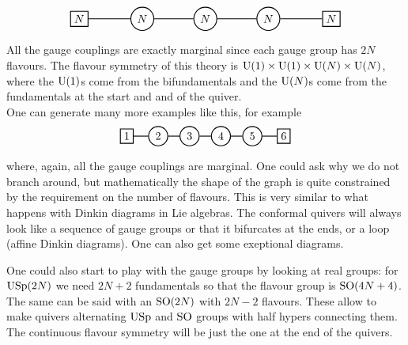 \begin{equation}
\begin{tikzpicture}[thick]
  \node[circle,draw] (one) at (0,0) {$N$};
  \node[circle,draw]  (two) at (2,0) {$N$};
  \node[circle,draw]  (three) at (4,0) {$N$};
  \node[rectangle,draw]  (flav1) at (-2,0) {$N$};
  \node[rectangle,draw]  (flav2) at (6,0) {$N$};
  \draw[-](one)--(two);
  \draw[-](two)--(three);
  \draw[-](one)--(flav1);
  \draw[-](flav2)--(three);
\end{tikzpicture}
\end{equation}
All the gauge couplings are exactly marginal since each gauge group has $2N$ flavours. The flavour symmetry of this theory is $\mathrm{U}(1)\times\mathrm{U}(1)\times\mathrm{U}(N)\times\mathrm{U}(N)$, where the $\mathrm{U}(1)$s come from the bifundamentals and the $\mathrm{U}(N)$s come from the fundamentals at the start and and of the quiver.\\
One can generate many more examples like this, for example
\begin{equation}
\begin{tikzpicture}[thick]
  \node[circle,draw] (one) at (0,0) {$2$};
  \node[circle,draw]  (two) at (1,0) {$3$};
  \node[circle,draw]  (three) at (2,0) {$4$};
  \node[circle,draw]  (four) at (3,0) {$5$};
  \node[rectangle,draw]  (flav1) at (-1,0) {$1$};
  \node[rectangle,draw]  (flav2) at (4,0) {$6$};
  \draw[-](one)--(two);
  \draw[-](two)--(three);
  \draw[-](three)--(four);
  \draw[-](one)--(flav1);
  \draw[-](flav2)--(four);
\end{tikzpicture}
\end{equation}
where, again, all the gauge couplings are marginal. One could ask why we do not branch around, but mathematically the shape of the graph is quite constrained by the requirement on the number of flavours. This is very similar to what happens with Dinkin diagrams in Lie algebras. The conformal quivers will always look like a sequence of gauge groups or that it bifurcates at the ends, or a loop (affine Dinkin diagrams). One can also get some exeptional diagrams.

One could also start to play with the gauge groups by looking at real groups: for $\mathrm{USp}(2N)$ we need $2N+2$ fundamentals so that the flavour group is $\mathrm{SO}(4N+4)$. The same can be said with an $\mathrm{SO}(2N)$ with $2N-2$ flavours. These allow to make quivers alternating $\mathrm{USp}$ and $\mathrm{SO}$ groups with half hypers connecting them. The continuous flavour symmetry will be just the one at the end of the quivers.

